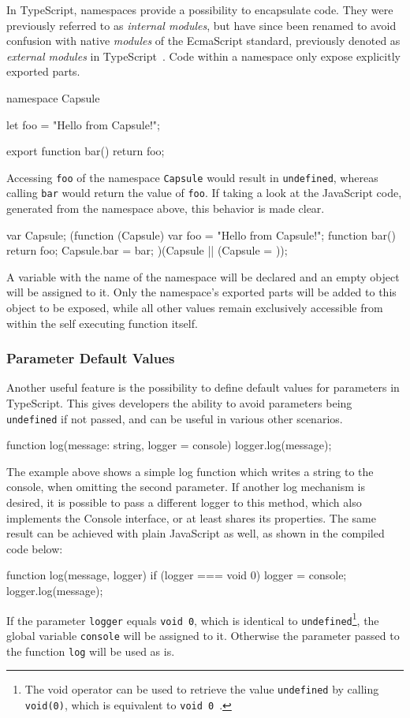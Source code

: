 In TypeScript, namespaces provide a possibility to encapsulate code. They were previously referred to as \emph{internal modules}, but have since been renamed to avoid confusion with native \emph{modules} of the EcmaScript standard, previously denoted as \emph{external modules} in TypeScript~\cite{TypeScriptHandbook:Namespaces}. Code within a namespace only expose explicitly exported parts.
\begin{JsCode}[numbers=none]
namespace Capsule {
  let foo = "Hello from Capsule!";
  
  export function bar() {
    return foo;
  }
}
\end{JsCode}
Accessing \texttt{foo} of the namespace \texttt{Capsule} would result in \texttt{undefined}, whereas calling \texttt{bar} would return the value of \texttt{foo}. If taking a look at the JavaScript code, generated from the namespace above, this behavior is made clear.
\begin{JsCode}[numbers=none]
var Capsule;
(function (Capsule) {
    var foo = "Hello from Capsule!";
    function bar() {
        return foo;
    }
    Capsule.bar = bar;
})(Capsule || (Capsule = {}));
\end{JsCode}
A variable with the name of the namespace will be declared and an empty object will be assigned to it. Only the namespace's exported parts will be added to this object to be exposed, while all other values 
remain exclusively accessible from within the self executing function itself.

\subsubsection{Parameter Default Values}
\label{sec:ts-parameter-default-values}

Another useful feature is the possibility to define default values for parameters in TypeScript. This gives developers the ability to avoid parameters being \texttt{undefined} if not passed, and can be useful in various other scenarios.
\begin{JsCode}[numbers=none]
function log(message: string, logger = console) {
  logger.log(message);
}
\end{JsCode}
The example above shows a simple log function which writes a string to the console, when omitting the second parameter. If another log mechanism is desired, it is possible to pass a different logger to this method, which also implements the Console interface, or at least shares its properties.
The same result can be achieved with plain JavaScript as well, as shown in the compiled code below:
\begin{JsCode}[numbers=none]
function log(message, logger) {
    if (logger === void 0) { logger = console; }
    logger.log(message);
}
\end{JsCode}
If the parameter \texttt{logger} equals \texttt{void 0}, which is identical to \texttt{undefined}\footnote{The void operator can be used to retrieve the value \texttt{undefined} by calling \texttt{void(0)}, which is equivalent to \texttt{void 0}~\cite{void:MDN:2017}.}, the global variable \texttt{console} will be assigned to it. Otherwise the parameter passed to the function \texttt{log} will be used as is.

